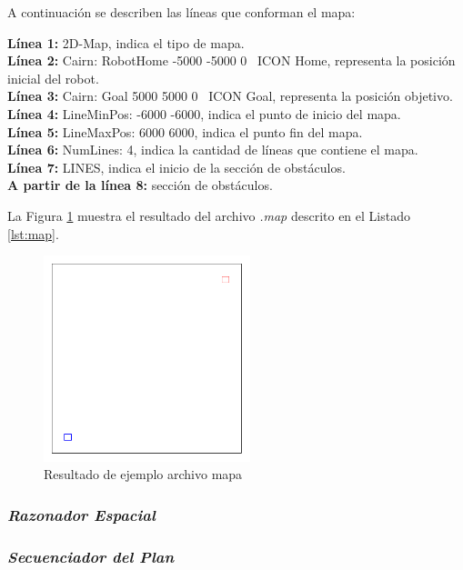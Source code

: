 \documentclass[11pt,twoside,A5]{article}
\newcommand{\reflistings}[1]{Listado \ref{#1}}
\newcommand{\reffigure}[1]{Figura \ref{#1}}
\newcommand{\sourcecode}[2][\footnotesize]{{\ttfamily#1#2}}
\begin{document}
A continuación se describen las líneas que conforman el mapa:

\noindent\textbf{Línea 1:} \sourcecode{2D-Map}, indica el tipo de mapa.
\\\textbf{Línea 2:} \sourcecode{Cairn: RobotHome -5000 -5000 0 \textquotedbl\textquotedbl~ICON \textquotedbl Home\textquotedbl}, representa la posición inicial del robot.
\\\textbf{Línea 3:} \sourcecode{Cairn: Goal 5000 5000 0 \textquotedbl\textquotedbl~ICON \textquotedbl Goal\textquotedbl}, representa la posición objetivo.
\\\textbf{Línea 4:} \sourcecode{LineMinPos: -6000 -6000}, indica el punto de inicio del mapa.
\\\textbf{Línea 5:} \sourcecode{LineMaxPos: 6000 6000}, indica el punto fin del mapa.
\\\textbf{Línea 6:} \sourcecode{NumLines: 4}, indica la cantidad de líneas que contiene el mapa.
\\\textbf{Línea 7:} \sourcecode{LINES}, indica el inicio de la sección de obstáculos.
\\\textbf{A partir de la línea 8:} sección de obstáculos.

La \reffigure{fig:map} muestra el resultado del archivo \textit{.map} descrito en el \reflistings{lst:map}.

\begin{figure}[here]
\begin{center}
\includegraphics[width=6cm]{map.png} 
\caption{Resultado de ejemplo archivo mapa}
\label{fig:map}
\end{center}
\end{figure} 

\subsubsection*{\textit{Razonador Espacial}}

\subsubsection*{\textit{Secuenciador del Plan}}
\end{document}
